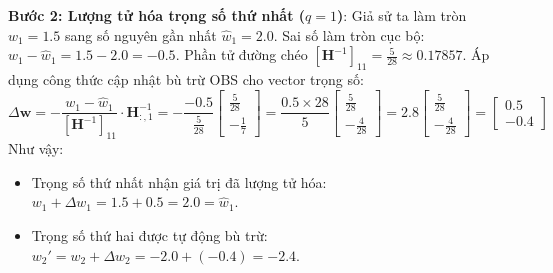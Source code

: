 \begin{example}
\textbf{Bước 2: Lượng tử hóa trọng số thứ nhất ($q=1$)}:
Giả sử ta làm tròn $w_1 = 1.5$ sang số nguyên gần nhất $\hat{w}_1 = 2.0$.
Sai số làm tròn cục bộ: $w_1 - \hat{w}_1 = 1.5 - 2.0 = -0.5$.
Phần tử đường chéo $[\mathbf{H}^{-1}]_{11} = \frac{5}{28} \approx 0.17857$.
Áp dụng công thức cập nhật bù trừ OBS cho vector trọng số:
\begin{equation*}
\Delta \mathbf{w} = - \frac{w_1 - \hat{w}_1}{[\mathbf{H}^{-1}]_{11}} \cdot \mathbf{H}^{-1}_{:, 1} = - \frac{-0.5}{\frac{5}{28}} \begin{bmatrix} \frac{5}{28} \\ -\frac{1}{7} \end{bmatrix} = \frac{0.5 \times 28}{5} \begin{bmatrix} \frac{5}{28} \\ -\frac{4}{28} \end{bmatrix} = 2.8 \begin{bmatrix} \frac{5}{28} \\ -\frac{4}{28} \end{bmatrix} = \begin{bmatrix} 0.5 \\ -0.4 \end{bmatrix}
\end{equation*}
Như vậy:
\begin{itemize}
  \item Trọng số thứ nhất nhận giá trị đã lượng tử hóa: $w_1 + \Delta w_1 = 1.5 + 0.5 = 2.0 = \hat{w}_1$.
  \item Trọng số thứ hai được tự động bù trừ: $w_2' = w_2 + \Delta w_2 = -2.0 + (-0.4) = -2.4$.
\end{itemize}


\end{example}
